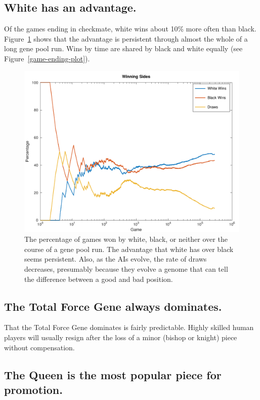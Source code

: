 \documentclass[letterpaper]{article}
\renewcommand{\_}{\allowbreak\textunderscore\allowbreak}
\begin{document}
\subsection{White has an advantage.}

Of the games ending in checkmate, white wins about 10\% more often than black. Figure~\ref{win-lose-plot} shows that the advantage is persistent through almost the whole of a long gene pool run. Wins by time are shared by black and white equally (see Figure~\ref{game-ending-plot}).
\begin{figure}[htb]
	\centering
	\includegraphics[width=\textwidth]{win-lose-plot}
	\caption{The percentage of games won by white, black, or neither over the course of a gene pool run. The advantage that white has over black seems persistent. Also, as the AIs evolve, the rate of draws decreases, presumably because they evolve a genome that can tell the difference between a good and bad position.}\label{win-lose-plot}
\end{figure}

\subsection{The Total Force Gene always dominates.}\label{total-force-result}

That the Total Force Gene dominates is fairly predictable. Highly skilled human players will usually resign after the loss of a minor (bishop or knight) piece without compensation.

\subsection{The Queen is the most popular piece for promotion.}
\end{document}
